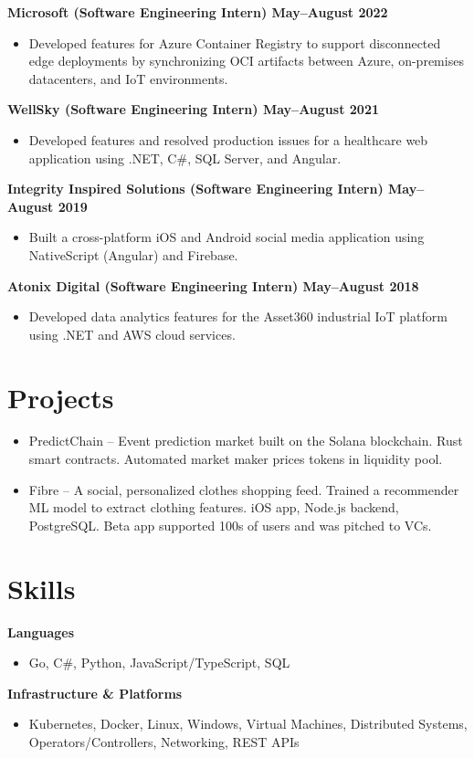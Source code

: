 \documentclass[11pt]{article}
\begin{document}
\textbf{Microsoft (Software Engineering Intern) \hfill May--August 2022}
\begin{itemize}
    \item Developed features for Azure Container Registry to support disconnected edge deployments by synchronizing OCI artifacts between Azure, on-premises datacenters, and IoT environments.
\end{itemize}

\textbf{WellSky (Software Engineering Intern) \hfill May--August 2021}
\begin{itemize}
    \item Developed features and resolved production issues for a healthcare web application using .NET, C\#, SQL Server, and Angular.
\end{itemize}

\textbf{Integrity Inspired Solutions (Software Engineering Intern) \hfill May--August 2019}
\begin{itemize}
    \item Built a cross-platform iOS and Android social media application using NativeScript (Angular) and Firebase.
\end{itemize}

\textbf{Atonix Digital (Software Engineering Intern) \hfill May--August 2018}
\begin{itemize}
    \item Developed data analytics features for the Asset360 industrial IoT platform using .NET and AWS cloud services.
\end{itemize}

\section{Projects}

\begin{itemize}
    \item PredictChain -- Event prediction market built on the Solana blockchain. Rust smart contracts. Automated market maker prices tokens in liquidity pool.
    \item Fibre -- A social, personalized clothes shopping feed. Trained a recommender ML model to extract clothing features. iOS app, Node.js backend, PostgreSQL. Beta app supported 100s of users and was pitched to VCs.
\end{itemize}

\section{Skills}

\textbf{Languages}
\begin{itemize}
    \item Go, C\#, Python, JavaScript/TypeScript, SQL
\end{itemize}

\textbf{Infrastructure \& Platforms}
\begin{itemize}
    \item Kubernetes, Docker, Linux, Windows, Virtual Machines, Distributed Systems, Operators/Controllers, Networking, REST APIs
\end{itemize}
\end{document}
